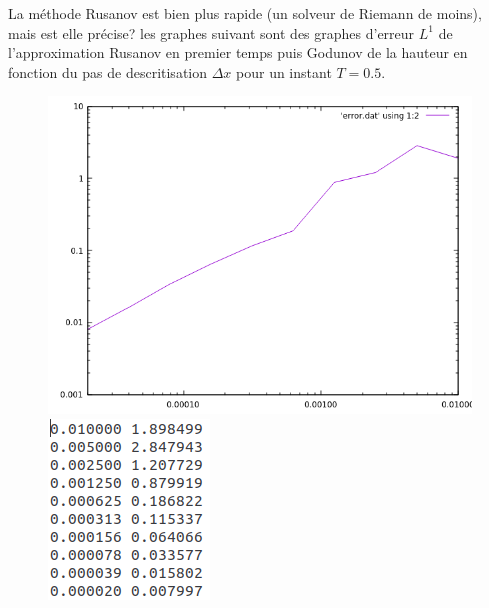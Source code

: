 \newpage

La m\'ethode Rusanov est bien plus rapide (un solveur de Riemann de moins), mais est elle pr\'ecise? les graphes suivant sont des graphes d'erreur $L^1$ de l'approximation Rusanov en premier temps puis Godunov de la hauteur en fonction du pas de descritisation $\Delta x$ pour un instant $T = 0.5$.

\begin{figure}[h!]
	\centering \includegraphics[scale=0.5]{Images_Fichiers/rusaerror_05.png}
	\centering \includegraphics[scale=0.5]{Images_Fichiers/table_rusa.png}
\end{figure}

